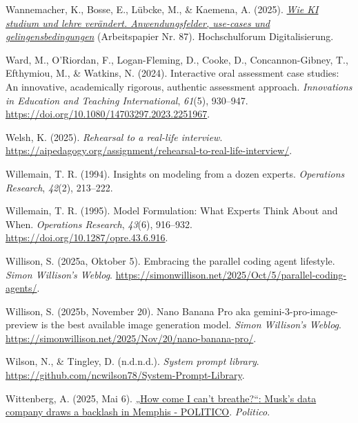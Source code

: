 \documentclass[
  ngerman,
  letterpaper,
  DIV=11]{scrreprt}
\newlength{\cslhangindent}
\newenvironment{CSLReferences}[2] %
 {\begin{list}{}{%
  \setlength{\itemindent}{0pt}
  \setlength{\leftmargin}{0pt}
  \setlength{\parsep}{0pt}
  \ifodd #1
   \setlength{\leftmargin}{\cslhangindent}
   \setlength{\itemindent}{-1\cslhangindent}
  \fi
  \setlength{\itemsep}{#2\baselineskip}}}
 {\end{list}}
\begin{document}
\begin{CSLReferences}{1}{0}
Wannemacher, K., Bosse, E., Lübcke, M., \& Kaemena, A. (2025).
\emph{\href{https://hochschulforumdigitalisierung.de/dossier/generative-ki/}{Wie
KI studium und lehre verändert. Anwendungsfelder, use-cases und
gelingensbedingungen}} (Arbeitspapier Nr. 87). Hochschulforum
Digitalisierung.

Ward, M., O'Riordan, F., Logan-Fleming, D., Cooke, D., Concannon-Gibney,
T., Efthymiou, M., \& Watkins, N. (2024). Interactive oral assessment
case studies: An innovative, academically rigorous, authentic assessment
approach. \emph{Innovations in Education and Teaching International},
\emph{61}(5), 930--947.
\url{https://doi.org/10.1080/14703297.2023.2251967}.

Welsh, K. (2025). \emph{Rehearsal to a real-life interview}.
\url{https://aipedagogy.org/assignment/rehearsal-to-real-life-interview/}.

Willemain, T. R. (1994). Insights on modeling from a dozen experts.
\emph{Operations Research}, \emph{42}(2), 213--222.

Willemain, T. R. (1995). Model Formulation: What Experts Think About and
When. \emph{Operations Research}, \emph{43}(6), 916--932.
\url{https://doi.org/10.1287/opre.43.6.916}.

Willison, S. (2025a, Oktober 5). Embracing the parallel coding agent
lifestyle. \emph{Simon Willison's Weblog}.
\url{https://simonwillison.net/2025/Oct/5/parallel-coding-agents/}.

Willison, S. (2025b, November 20). Nano Banana Pro aka
gemini-3-pro-image-preview is the best available image generation model.
\emph{Simon Willison's Weblog}.
\url{https://simonwillison.net/2025/Nov/20/nano-banana-pro/}.

Wilson, N., \& Tingley, D. (n.d.n.d.). \emph{System prompt library}.
\url{https://github.com/ncwilson78/System-Prompt-Library}.

Wittenberg, A. (2025, Mai 6).
\href{https://www.politico.com/news/2025/05/06/elon-musk-xai-memphis-gas-turbines-air-pollution-permits-00317582}{{„How
come I can't breathe?``}: Musk's data company draws a backlash in
Memphis - POLITICO}. \emph{Politico}.


\end{CSLReferences}
\end{document}

